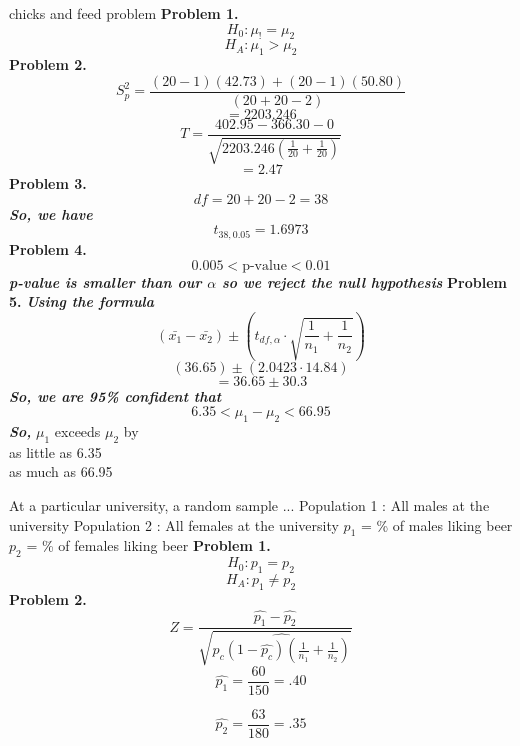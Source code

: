 \documentclass{report}
\begin{document}
\pagebreak
\noindent
\q
chicks and feed problem
\bigbreak \noindent
\textbf{Problem 1.} 
$$ H_0 : \mu_! = \mu_2$$
$$ H_A : \mu_1 > \mu_2$$
\textbf{Problem 2.}
$$ S_p^2 = \dfrac{(20-1)(42.73) + (20-1)(50.80)}{(20+20-2)}$$
$$ = 2203.246$$
$$ T = \dfrac{402.95 - 366.30 - 0}{\sqrt{2203.246(\frac{1}{20} + \frac{1}{20})}}$$ 
$$ = 2.47$$
\textbf{Problem 3.}
$$ df = 20+20-2 = 38$$
\textit{\textbf{So, we have}}
$$ t_{38, 0.05} = 1.6973$$
\textbf{Problem 4.}
$$ 0.005 < \text{p-value} < 0.01$$
\textit{\textbf{p-value is smaller than our $\alpha$ so we reject the null hypothesis}}
\bigbreak \noindent
\textbf{Problem 5.}
\bigbreak \noindent
\textit{\textbf{Using the formula}}
$$ \left(\bar{x_1} - \bar{x_2}\right)\pm \left(t_{df, \alpha}\cdot \sqrt{\frac{1}{n_1}+ {\frac{1}{n_2}}}\right)$$
$$ (36.65)\pm \left(2.0423\cdot 14.84\right)$$ 
$$ = 36.65 \pm 30.3$$
\textit{\textbf{So, we are 95\% confident that}}
$$ 6.35 < \mu_1 -\mu_2 < 66.95$$
\textit{\textbf{So,}}
$\mu_1$ exceeds $ \mu_2$ by \\ as little as 6.35 \\ as much as 66.95


\pagebreak
\q
At a particular university, a random sample ...
\bigbreak \noindent
Population 1 : All males at the university
\bigbreak \noindent 
Population 2 : All females at the university
\bigbreak \noindent
$p_1$ = \% of males liking beer
\bigbreak \noindent
$p_2$ = \% of females liking beer
\bigbreak \noindent
\textbf{Problem 1.}
$$ H_0 : p_1 = p_2$$
$$ H_A : p_1 \neq p_2$$
\bigbreak \noindent
\textbf{Problem 2.}
$$ Z = \dfrac{\hat{p_1} - \hat{p_2}}{\sqrt{\hat{p_c(1-\hat{p_c})(\frac{1}{n_1} + \frac{1}{n_2})}}}$$
$$ \hat{p_1} = \dfrac{60}{150} = .40$$

$$ \hat{p_2} = \dfrac{63}{180} = .35$$
\end{document}
